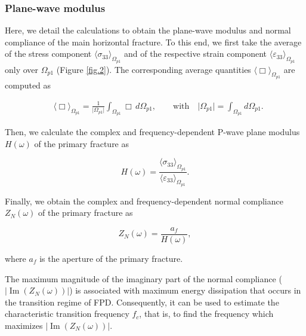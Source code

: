 \documentclass[draft]{agujournal2019}
\renewcommand{\Im}{\operatorname{Im} }
\begin{document}
\subsubsection{Plane-wave modulus}

Here, we detail the calculations to obtain the plane-wave modulus and normal compliance of the main horizontal fracture.  To this end, we first take the average of the stress component $\langle \sigma_{33} \rangle_{\Omega_{p1}}$ and of the respective strain component $\langle \varepsilon_{33} \rangle_{\Omega_{p1}}$ only over $\Omega_{p1}$ (Figure \ref{fig.2}). The corresponding average quantities $\langle \Box \rangle_{\Omega_{p1}}$ are computed as
\begin{linenomath*}
\begin{equation}\label{Eq.10}
\begin{split}
&\langle \Box \rangle_{\Omega_{p1}} = \frac{1}{\vert \Omega_{p1} \vert} \int_{\Omega_{p1}} \Box \, d\Omega_{p1}, \qquad \text{with} \quad  \vert \Omega_{p1} \vert = \int_{\Omega_{p1}}  d\Omega_{p1}.
\end{split}
\end{equation}
\end{linenomath*}

Then, we calculate the complex and frequency-dependent P-wave plane modulus $H(\omega)$ of the primary fracture as
\begin{linenomath*}
\begin{equation}\label{Eq.11}
H(\omega)= \frac{\langle \sigma_{33} \rangle_{\Omega_{p1}}}{\langle \varepsilon_{33} \rangle_{\Omega_{p1}}}.
\end{equation}
\end{linenomath*} 

Finally, we obtain the complex and frequency-dependent normal compliance $Z_N (\omega) $ of the primary fracture as
\begin{linenomath*}
\begin{equation}\label{Eq.12}
Z_N(\omega)= \frac{a_f}{H(\omega)}, 
\end{equation}
\end{linenomath*} 
where $a_f$ is the aperture of the primary fracture. 

The maximum magnitude of the imaginary part of the normal compliance ($ |\Im(Z_N (\omega))|$) is associated with maximum energy dissipation \cite{Rubino2015a} that occurs in the transition regime of FPD. Consequently, it can be used to estimate the characteristic transition frequency $f_c$, that is, to find the frequency which maximizes $ |\Im(Z_N (\omega))|$.
\end{document}
